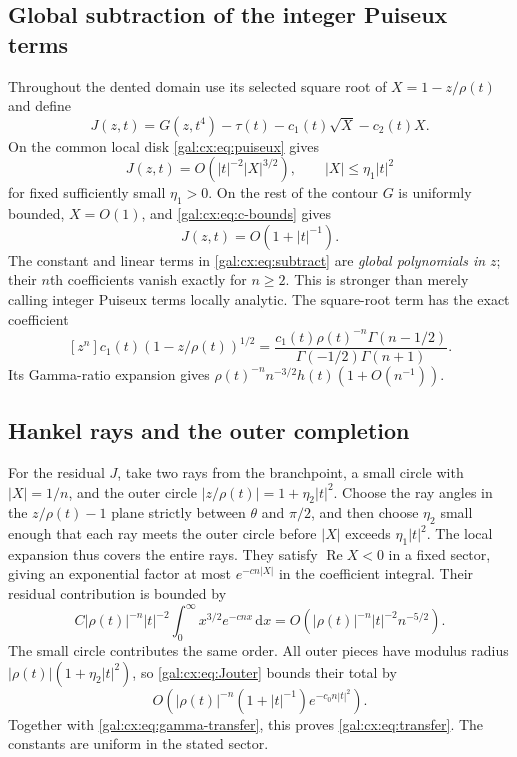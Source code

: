 \documentclass[11pt,letterpaper]{article}
\numberwithin{equation}{section}
\theoremstyle{definition}\newtheorem{definition}[theorem]{Definition}
\theoremstyle{remark}\newtheorem{remark}[theorem]{Remark}
\newcommand{\dd}{\mathrm d}
\begin{document}
\subsection{Global subtraction of the integer Puiseux terms}
Throughout the dented domain use its selected square root of $X=1-z/\rho(t)$ and define
\begin{equation}\label{gal:cx:eq:subtract}
J(z,t)=G(z,t^4)-\tau(t)-c_1(t)\sqrt X-c_2(t)X.
\end{equation}
On the common local disk \eqref{gal:cx:eq:puiseux} gives
\begin{equation}\label{gal:cx:eq:Jlocal}
J(z,t)=O(|t|^{-2}|X|^{3/2}),\qquad |X|\le\eta_1|t|^2
\end{equation}
for fixed sufficiently small $\eta_1>0$. On the rest of the contour $G$ is uniformly bounded, $X=O(1)$, and \eqref{gal:cx:eq:c-bounds} gives
\begin{equation}\label{gal:cx:eq:Jouter}
J(z,t)=O(1+|t|^{-1}).
\end{equation}
The constant and linear terms in \eqref{gal:cx:eq:subtract} are \emph{global polynomials in $z$}; their $n$th coefficients vanish exactly for $n\ge2$. This is stronger than merely calling integer Puiseux terms locally analytic. The square-root term has the exact coefficient
\begin{equation}\label{gal:cx:eq:gamma-transfer}
[z^n]c_1(t)(1-z/\rho(t))^{1/2}
=\frac{c_1(t)\rho(t)^{-n}\Gamma(n-1/2)}{\Gamma(-1/2)\Gamma(n+1)}.
\end{equation}
Its Gamma-ratio expansion gives $\rho(t)^{-n}n^{-3/2}h(t)(1+O(n^{-1}))$.

\subsection{Hankel rays and the outer completion}
For the residual $J$, take two rays from the branchpoint, a small circle with $|X|=1/n$, and the outer circle
$|z/\rho(t)|=1+\eta_2|t|^2$.
Choose the ray angles in the $z/\rho(t)-1$ plane strictly between $\theta$ and $\pi/2$, and then choose $\eta_2$ small enough that each ray meets the outer circle before $|X|$ exceeds $\eta_1|t|^2$. The local expansion thus covers the entire rays. They satisfy $\operatorname{Re}X<0$ in a fixed sector, giving an exponential factor at most $e^{-cn|X|}$ in the coefficient integral. Their residual contribution is bounded by
\begin{equation}\label{gal:cx:eq:hankel-error}
C|\rho(t)|^{-n}|t|^{-2}\int_0^\infty x^{3/2}e^{-cnx}\,\dd x
=O(|\rho(t)|^{-n}|t|^{-2}n^{-5/2}).
\end{equation}
The small circle contributes the same order. All outer pieces have modulus radius $|\rho(t)|(1+\eta_2|t|^2)$, so \eqref{gal:cx:eq:Jouter} bounds their total by
\[
O\!\left(|\rho(t)|^{-n}(1+|t|^{-1})e^{-c_0n|t|^2}\right).
\]
Together with \eqref{gal:cx:eq:gamma-transfer}, this proves \eqref{gal:cx:eq:transfer}. The constants are uniform in the stated sector.
\end{document}
